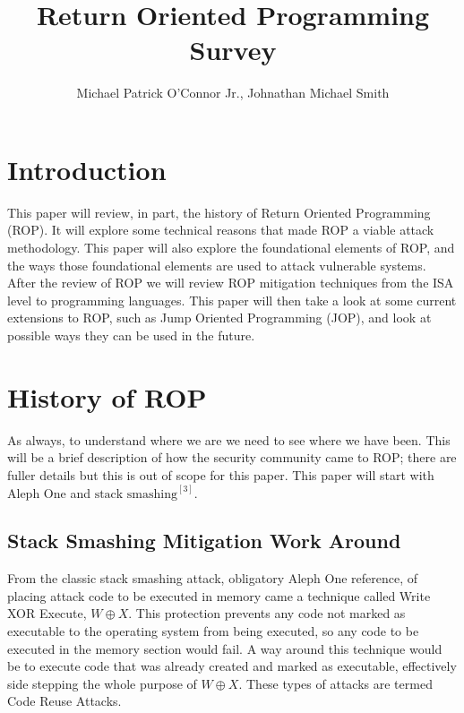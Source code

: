 \documentclass[11pt]{amsart}
\title{Return Oriented Programming Survey}
\author{Michael Patrick O'Connor Jr., Johnathan Michael Smith}
\date{}
\begin{document}
\maketitle

\newpage
\section*{Introduction}
This paper will review, in part, the history of Return Oriented Programming (ROP). It will explore some technical reasons that made ROP a viable attack methodology. This paper will also explore the foundational elements of ROP, and the ways those foundational elements are used to attack vulnerable systems. After the review of ROP we will review ROP mitigation techniques from the ISA level to programming languages. This paper will then take a look at some current extensions to ROP, such as Jump Oriented Programming (JOP), and look at possible ways they can be used in the future.
\section*{History of ROP}
As always, to understand where we are we need to see where we have been. This will be a brief description of how the security community came to ROP; there are fuller details but this is out of scope for this paper. This paper will start with Aleph One and $\text{stack smashing}^{[3]}$.
\subsection*{Stack Smashing Mitigation Work Around}
From the classic stack smashing attack, obligatory Aleph One reference, of placing attack code to be executed in memory came a technique called Write XOR Execute, $W \oplus X$. This protection prevents any code not marked as executable to the operating system from being executed, so any code to be executed in the memory section would fail. A way around this technique would be to execute code that was already created and marked as executable, effectively side stepping the whole purpose of $W \oplus X$. These types of attacks are termed Code Reuse Attacks.
\end{document}
